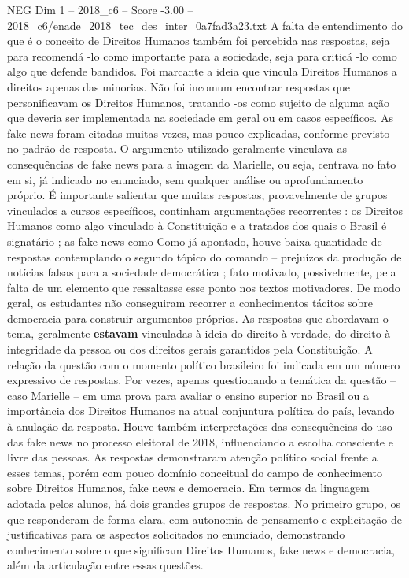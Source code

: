 \begin{textsample}{NEG Dim 1 – 2018\_c6 – Score -3.00 – 2018\_c6/enade\_2018\_tec\_des\_inter\_0a7fad3a23.txt}
A falta de entendimento do que é o conceito de Direitos Humanos também foi percebida nas respostas, seja para recomendá -lo como importante para a sociedade, seja para criticá -lo como algo que defende bandidos.
Foi marcante a ideia que vincula Direitos Humanos a direitos apenas das minorias.
Não foi incomum encontrar respostas que personificavam os Direitos Humanos, tratando -os como sujeito de alguma ação que deveria ser implementada na sociedade em geral ou em casos específicos.
As fake news foram citadas muitas vezes, mas pouco explicadas, conforme previsto no padrão de resposta.
O argumento utilizado geralmente vinculava as consequências de fake news para a imagem da Marielle, ou seja, centrava no fato em si, já indicado no enunciado, sem qualquer análise ou aprofundamento próprio.
É importante salientar que muitas respostas, provavelmente de grupos vinculados a cursos específicos, continham argumentações recorrentes : os Direitos Humanos como algo vinculado à Constituição e a tratados dos quais o Brasil é signatário ; as fake news como Como já apontado, houve baixa quantidade de respostas contemplando o segundo tópico do comando – prejuízos da produção de notícias falsas para a sociedade democrática ; fato motivado, possivelmente, pela falta de um elemento que ressaltasse esse ponto nos textos motivadores.
De modo geral, os estudantes não conseguiram recorrer a conhecimentos tácitos sobre democracia para construir argumentos próprios.
As respostas que abordavam o tema, geralmente \textbf{estavam} vinculadas à ideia do direito à verdade, do direito à integridade da pessoa ou dos direitos gerais garantidos pela Constituição.
A relação da questão com o momento político brasileiro foi indicada em um número expressivo de respostas.
Por vezes, apenas questionando a temática da questão – caso Marielle – em uma prova para avaliar o ensino superior no Brasil ou a importância dos Direitos Humanos na atual conjuntura política do país, levando à anulação da resposta.
Houve também interpretações das consequências do uso das fake news no processo eleitoral de 2018, influenciando a escolha consciente e livre das pessoas.
As respostas demonstraram atenção político social frente a esses temas, porém com pouco domínio conceitual do campo de conhecimento sobre Direitos Humanos, fake news e democracia.
Em termos da linguagem adotada pelos alunos, há dois grandes grupos de respostas.
No primeiro grupo, os que responderam de forma clara, com autonomia de pensamento e explicitação de justificativas para os aspectos solicitados no enunciado, demonstrando conhecimento sobre o que significam Direitos Humanos, fake news e democracia, além da articulação entre essas questões.

\end{textsample}
